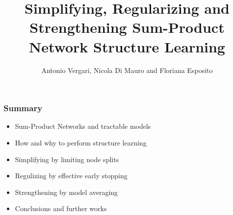 \documentclass[xcolor={usenames,dvipsnames,svgnames}, compress]{beamer}
\begin{document}
\newlength{\custombulletheight}
\setlength{\custombulletheight}{\dimexpr0.5\ht1-0.5\ht2}

\newcommand{\plusbullet}{\raisebox{\custombulletheight}{\hbox{\tiny\textcolor{lacamlilac}{$\boldsymbol{\oplus}$}}\hspace{-2pt}}}



% 

\title{Simplifying, Regularizing and Strengthening Sum-Product Network Structure Learning}
\author{Antonio  Vergari, Nicola  {Di Mauro} and Floriana Esposito}


{
  \begin{frame}
    \titlepage
  \end{frame}
}

\begin{frame}
  \frametitle{Summary}
  \begin{itemize}
    \itemsep 10pt
  \item Sum-Product Networks and tractable models
  \item How and why to perform structure learning
  \item Simplifying by limiting node splits
  \item Regulizing by effective early stopping
  \item Strengthening by model averaging
    \item Conclusions and further works
  \end{itemize}
\end{frame}
\end{document}
